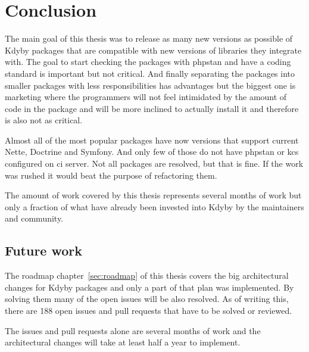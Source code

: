 \chapter{Conclusion}

The main goal of this thesis was to release as many new versions as possible of Kdyby packages that are compatible with new versions of libraries they integrate with. The goal to start checking the packages with \gls{phpstan} and have a coding standard is important but not critical. And finally separating the packages into smaller packages with less responsibilities has advantages but the biggest one is marketing where the programmers will not feel intimidated by the amount of code in the package and will be more inclined to actually install it and therefore is also not as critical.

Almost all of the most popular packages have now versions that support current Nette, Doctrine and Symfony. And only few of those do not have \gls{phpstan} or \acrlong{kcs} configured on \gls{ci} server. Not all packages are resolved, but that is fine. If the work was rushed it would beat the purpose of refactoring them.

The amount of work covered by this thesis represents several months of work but only a fraction of what have already been invested into Kdyby by the maintainers and community.

\section{Future work}

The roadmap chapter~\ref{sec:roadmap} of this thesis covers the big architectural changes for Kdyby packages and only a part of that plan was implemented. By solving them many of the open issues will be also resolved. As of writing this, there are 188 open issues and pull requests that have to be solved or reviewed.

The issues and pull requests alone are several months of work and the architectural changes will take at least half a year to implement.
